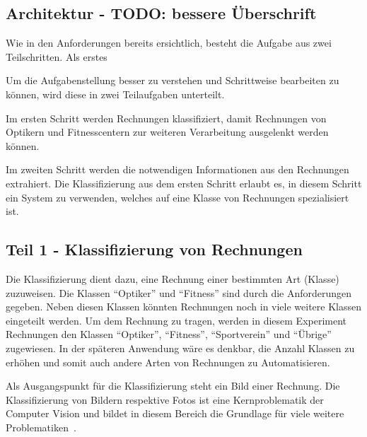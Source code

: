 
\subsection{Architektur - TODO: bessere Überschrift}

Wie in den Anforderungen bereits ersichtlich, besteht die Aufgabe aus zwei Teilschritten. Als erstes 

Um die Aufgabenstellung besser zu verstehen und Schrittweise bearbeiten zu können, wird diese in zwei Teilaufgaben unterteilt. 

Im ersten Schritt werden Rechnungen klassifiziert, damit Rechnungen von Optikern und Fitnesscentern zur weiteren Verarbeitung ausgelenkt werden können. 

Im zweiten Schritt werden die notwendigen Informationen aus den Rechnungen extrahiert. Die Klassifizierung aus dem ersten Schritt erlaubt es, in diesem Schritt ein System zu verwenden, welches auf eine Klasse von Rechnungen spezialisiert ist. 

\subsection{Teil 1 - Klassifizierung von Rechnungen}

Die Klassifizierung dient dazu, eine Rechnung einer bestimmten Art (Klasse) zuzuweisen. Die Klassen \enquote{Optiker} und \enquote{Fitness} sind durch die Anforderungen gegeben. Neben diesen Klassen könnten Rechnungen noch in viele weitere Klassen eingeteilt werden. Um dem Rechnung zu tragen, werden in diesem Experiment  Rechnungen den Klassen \enquote{Optiker}, \enquote{Fitness}, \enquote{Sportverein} und \enquote{Übrige} zugewiesen. In der späteren Anwendung wäre es denkbar, die Anzahl Klassen zu erhöhen und somit auch andere Arten von Rechnungen zu Automatisieren.

Als Ausgangspunkt für die Klassifizierung steht ein Bild einer Rechnung. Die Klassifizierung von Bildern respektive Fotos ist eine Kernproblematik der Computer Vision und bildet in diesem Bereich die Grundlage für viele weitere Problematiken~\autocite{http://cs231n.github.io/classification/}. 

